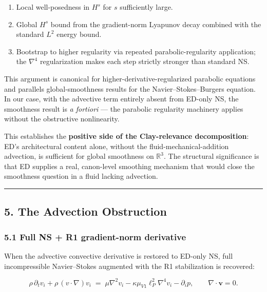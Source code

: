 \documentclass[
  11pt,a4paper]{article}
\providecommand{\tightlist}{%
  \setlength{\itemsep}{0pt}\setlength{\parskip}{0pt}}
\begin{document}
\begin{enumerate}
\def\labelenumi{\arabic{enumi}.}
\tightlist
\item
  Local well-posedness in \(H^s\) for \(s\) sufficiently large.
\item
  Global \(H^s\) bound from the gradient-norm Lyapunov decay combined
  with the standard \(L^2\) energy bound.
\item
  Bootstrap to higher regularity via repeated parabolic-regularity
  application; the \(\nabla^4\) regularization makes each step strictly
  stronger than standard NS.
\end{enumerate}

This argument is canonical for higher-derivative-regularized parabolic
equations and parallels global-smoothness results for the
Navier--Stokes--Burgers equation. In our case, with the advective term
entirely absent from ED-only NS, the smoothness result is \emph{a
fortiori} --- the parabolic regularity machinery applies without the
obstructive nonlinearity.

This establishes the \textbf{positive side of the Clay-relevance
decomposition}: ED's architectural content alone, without the
fluid-mechanical-addition advection, is sufficient for global smoothness
on \(\mathbb{R}^3\). The structural significance is that ED supplies a
real, canon-level smoothing mechanism that would close the smoothness
question in a fluid lacking advection.

\begin{center}\rule{0.5\linewidth}{0.5pt}\end{center}

\subsection{5. The Advection
Obstruction}\label{the-advection-obstruction}

\subsubsection{5.1 Full NS + R1 gradient-norm
derivative}\label{full-ns-r1-gradient-norm-derivative}

When the advective convective derivative is restored to ED-only NS, full
incompressible Navier--Stokes augmented with the R1 stabilization is
recovered:

\[\rho\,\partial_t v_i + \rho\,(v \cdot \nabla)v_i \;=\; \mu\nabla^2 v_i - \kappa\mu_{V1}\ell_P^2\nabla^4 v_i - \partial_i p, \qquad \nabla \cdot \mathbf{v} = 0.\]
\end{document}
